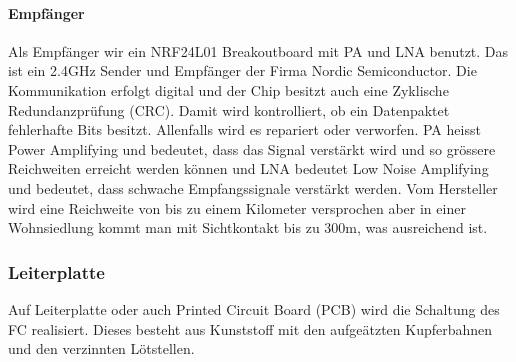 \documentclass[12pt,a4paper, ngerman]{article}
\begin{document}
\paragraph{Empfänger}
Als Empfänger wir ein NRF24L01 Breakoutboard mit PA und LNA benutzt. Das ist ein 2.4GHz Sender und Empfänger der Firma Nordic Semiconductor. Die Kommunikation erfolgt digital und der Chip besitzt auch eine Zyklische Redundanzprüfung (CRC). Damit wird kontrolliert, ob ein Datenpaktet fehlerhafte Bits besitzt. Allenfalls wird es repariert oder verworfen. PA heisst Power Amplifying und bedeutet, dass das Signal verstärkt wird und so grössere Reichweiten erreicht werden können und LNA bedeutet Low Noise Amplifying und bedeutet, dass schwache Empfangssignale verstärkt werden\cite{website:electronics.stackexchange.com_WhatisPALNA}. Vom Hersteller wird eine Reichweite von bis zu einem Kilometer versprochen aber in einer Wohnsiedlung kommt man mit Sichtkontakt bis zu 300m, was ausreichend ist.

\subsubsection{Leiterplatte}
Auf Leiterplatte oder auch Printed Circuit Board (PCB) wird die Schaltung des FC realisiert. Dieses besteht aus Kunststoff mit den aufgeätzten Kupferbahnen und den verzinnten Lötstellen.
\end{document}
